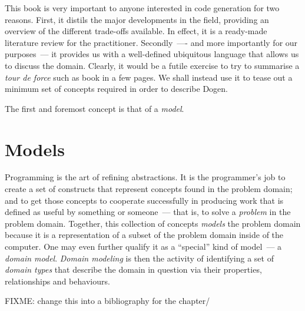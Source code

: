 \documentclass{book}
\begin{document}
This book is very important to anyone interested in code generation
for two reasons. First, it distils the major developments in the
field, providing an overview of the different trade-offs available. In
effect, it is a ready-made literature review for the
practitioner. Secondly~---- and more importantly for our purposes~---
it provides us with a well-defined ubiquitous language that allows us
to discuss the domain. Clearly, it would be a futile exercise to try
to summarise a \emph{tour de force} such as \cite{2004Model} book in a
few pages. We shall instead use it to tease out a minimum set of
concepts required in order to describe Dogen.

The first and foremost concept is that of a \emph{model}.

\section{Models}

Programming is the art of refining abstractions. It is the
programmer's job to create a set of constructs that represent concepts
found in the problem domain; and to get those concepts to cooperate
successfully in producing work that is defined as useful by something
or someone~--- that is, to solve a \emph{problem} in the problem
domain. Together, this collection of concepts \emph{models} the
problem domain because it is a representation of a subset of the
problem domain inside of the computer. One may even further qualify it
as a ``special'' kind of model~--- a \emph{domain model}. \emph{Domain
  modeling} is then the activity of identifying a set of \emph{domain
  types} that describe the domain in question via their properties,
relationships and behaviours.


FIXME: change this into a bibliography for the chapter/

\end{document}
